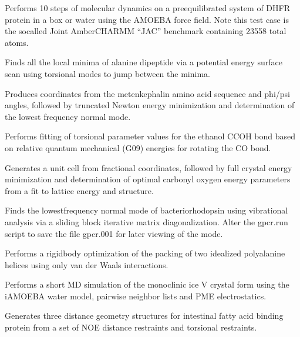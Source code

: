 \documentclass[letterpaper,11pt,english]{sphinxmanual}
\begin{document}

Performs 10 steps of molecular dynamics on a pre\sphinxhyphen{}equilibrated system of DHFR protein in a box or water using the AMOEBA force field. Note this test case is the so\sphinxhyphen{}called Joint Amber\sphinxhyphen{}CHARMM “JAC” benchmark containing 23558 total atoms.


Finds all the local minima of alanine dipeptide via a potential energy surface scan using torsional modes to jump between the minima.


Produces coordinates from the met\sphinxhyphen{}enkephalin amino acid sequence and phi/psi angles, followed by truncated Newton energy minimization and determination of the lowest frequency normal mode.


Performs fitting of torsional parameter values for the ethanol C\sphinxhyphen{}C\sphinxhyphen{}O\sphinxhyphen{}H bond based on relative quantum mechanical (G09) energies for rotating the C\sphinxhyphen{}O bond.


Generates a unit cell from fractional coordinates, followed by full crystal energy minimization and determination of optimal carbonyl oxygen energy parameters from a fit to lattice energy and structure.


Finds the lowest\sphinxhyphen{}frequency normal mode of bacteriorhodopsin using vibrational analysis via a sliding block iterative matrix diagonalization. Alter the gpcr.run script to save the file gpcr.001 for later viewing of the mode.


Performs a rigid\sphinxhyphen{}body optimization of the packing of two idealized polyalanine helices using only van der Waals interactions.


Performs a short MD simulation of the monoclinic ice V crystal form using the iAMOEBA water model, pairwise neighbor lists and PME electrostatics.


Generates three distance geometry structures for intestinal fatty acid binding protein from a set of NOE distance restraints and torsional restraints.
\end{document}
